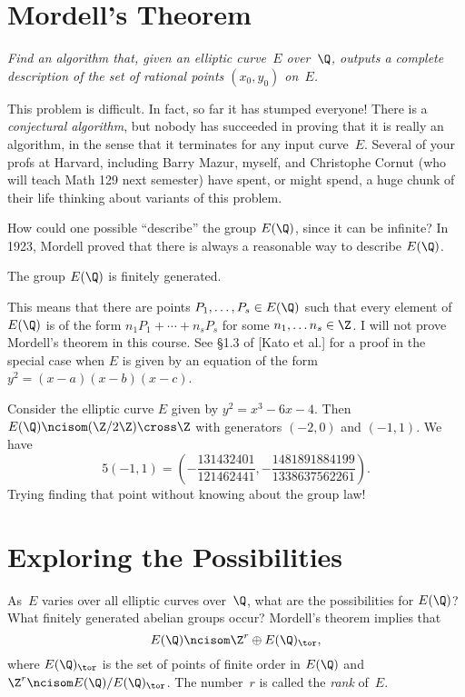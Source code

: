 \documentclass[11pt]{report}
\begin{document}
\section{Mordell's Theorem}
 {\em Find an algorithm that, given
  an elliptic curve~$E$ over~$\Q$, outputs a complete description
  of the set of rational points $(x_0, y_0)$ on~$E$.}\vspace{2ex}

This problem is difficult.  In fact, so far it has stumped everyone!
There is a {\em conjectural algorithm}, but nobody has succeeded in proving
that it is really an algorithm, in the sense that it terminates for
any input curve~$E$.  Several of your profs at Harvard, including
Barry Mazur, myself, and Christophe Cornut (who will teach Math 129
next semester) have spent, or might spend, a huge chunk of
their life thinking about variants of this problem.

How could one possible ``describe'' the group $E(\Q)$, since it can be
infinite?  In 1923, Mordell proved that there is
always a reasonable way to describe $E(\Q)$.

\begin{theorem}[Mordell]
  The group $E(\Q)$ is finitely generated.
\end{theorem}
This means that there are points $P_1,\ldots, P_s \in E(\Q)$
such that every element of $E(\Q)$ is of the form
$
  n_1 P_1 + \cdots + n_s P_s
$
for some $n_1, \ldots n_s\in\Z$.  I will not prove Mordell's theorem in
this course.  See \S1.3 of [Kato et al.] for a proof
in the special case when $E$ is given
by an equation of the form $y^2 = (x-a)(x-b)(x-c)$.


\begin{example}
  Consider the elliptic curve $E$ given by $y^2 = x^3 -6x - 4$.
  Then $E(\Q)\ncisom (\Z/2\Z)\cross \Z$ with generators $(-2,0)$ and
  $(-1,1)$.  We have
  $$5(-1,1) = \left(-\frac{131432401}{121462441} , -\frac{1481891884199}{1338637562261}\right).$$
  Trying finding that point without knowing about the group law!
\end{example}

\section{Exploring the Possibilities}
As~$E$ varies over all elliptic curves over~$\Q$, what
are the possibilities for $E(\Q)$?  What finitely generated
abelian groups occur?  Mordell's theorem implies that
$$
  E(\Q) \ncisom \Z^r \oplus E(\Q)_{\tor},
$$
where $E(\Q)_{\tor}$ is the set of points of finite
order in $E(\Q)$ and $\Z^r\ncisom E(\Q)/E(\Q)_{\tor}$.
The number~$r$ is called the {\em rank} of~$E$.
\end{document}
